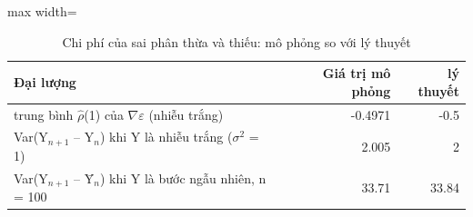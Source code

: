 \begin{table}[H]
\centering\small
\caption{Chi phí của sai phân thừa và thiếu: mô phỏng so với lý thuyết}\label{tab:tab_b12_03_cost_simulation}
\begin{adjustbox}{max width=\linewidth}
\begin{tabular}{>{\raggedright\arraybackslash}p{}rr}
\toprule
Đại lượng & Giá trị mô phỏng & lý thuyết \\
\midrule
trung bình $\hat{\rho}$(1) của $\nabla\varepsilon$ (nhiễu trắng) & -0.4971 & -0.5 \\
Var(Y$_{n+1}$ – Y$_{n}$) khi Y là nhiễu trắng ($\sigma^{2}$ = 1) & 2.005 & 2 \\
Var(Y$_{n+1}$ – Ȳ$_{n}$) khi Y là bước ngẫu nhiên, n = 100 & 33.71 & 33.84 \\
\bottomrule
\end{tabular}
\end{adjustbox}
\end{table}
